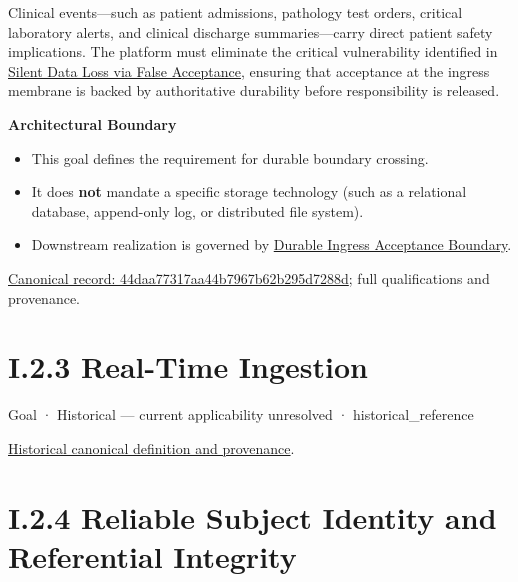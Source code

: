 Clinical events—such as patient admissions, pathology test orders, critical laboratory alerts, and clinical discharge summaries—carry direct patient safety implications. The platform must eliminate the critical vulnerability identified in \href{\detokenize{../../../../../docs/markdown/01-motivation/drivers-assessments/assessments.md}}{Silent Data Loss via False Acceptance}, ensuring that acceptance at the ingress membrane is backed by authoritative durability before responsibility is released.



\par\medskip\textbf{Architectural Boundary}\par


\begin{itemize}


\item This goal defines the requirement for durable boundary crossing.

\item It does \textbf{not} mandate a specific storage technology (such as a relational database, append-only log, or distributed file system).

\item Downstream realization is governed by \href{\detokenize{../../../../../docs/markdown/01-motivation/requirements-constraints/foundational-requirements.md}}{\texttt{} Durable Ingress Acceptance Boundary}.

\end{itemize}

{\footnotesize \href{../../../../continuum/motivation/goal/44daa77317aa44b7967b62b295d7288d.md}{Canonical record: 44daa77317aa44b7967b62b295d7288d}; full qualifications and provenance.}\par
\section*{I.2.3 Real-Time Ingestion}
\label{navigation:I.2.3}

\label{element:d43c345839e548589e2b6aa677022f8b}
{\small Goal · Historical — current applicability unresolved · historical\_reference}\par
\href{../../../../continuum/motivation/goal/d43c345839e548589e2b6aa677022f8b.md}{Historical canonical definition and provenance}.\par
\section*{I.2.4 Reliable Subject Identity and Referential Integrity}
\label{navigation:I.2.4}

